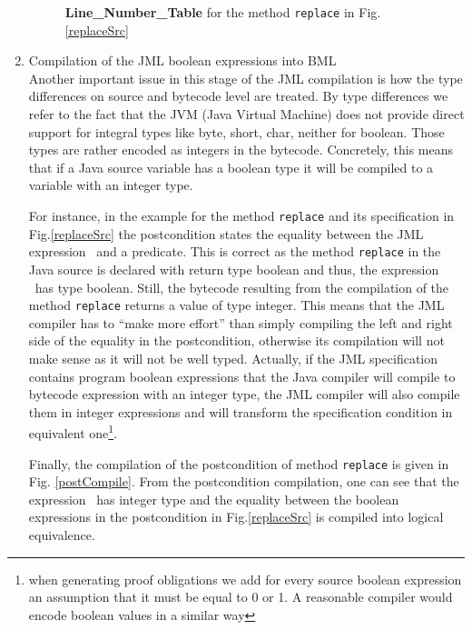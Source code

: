 \begin{enumerate}
\begin{figure}[t]
\caption{\textbf{Line\_Number\_Table}  {\sc for the method } \texttt{replace} {\sc in Fig.  \ref{replaceSrc}  } }
\label{bml:compiler:loopEntry}
\end{figure} 

      
      
\item Compilation of the JML boolean expressions into BML \\
      
     

Another important issue in this stage of the JML compilation is how
the type differences on source and bytecode level are treated. By type
differences we refer to the fact that the JVM (Java Virtual Machine)
does not provide direct support for integral types like byte, short,
char, neither for boolean. Those types are rather encoded as integers
in the bytecode. Concretely, this means that if a Java source variable
has a boolean type it will be compiled to a variable with an integer
type.


 For instance, in the example for the method
\texttt{replace} and its specification in Fig.\ref{replaceSrc} the postcondition states the equality between the JML expression  
\result \ and a predicate. This is correct as the method \texttt{replace} in the Java source is declared with return type boolean  and thus,
 the expression \result \ has type boolean. Still, the bytecode
 resulting from the compilation of the method \texttt{replace} returns
 a value of type integer. This means that the JML compiler has to
 ``make more effort'' than simply compiling the left and right side of
 the equality in the postcondition, otherwise its compilation will not
 make sense as it will not be well typed. Actually, if the JML
 specification contains program boolean expressions that the Java
 compiler will compile to bytecode expression with an integer type,
 the JML compiler will also compile them in integer expressions and
 will transform the specification condition in equivalent
 one\footnote{when generating proof obligations we add for every
 source boolean expression an assumption that it must be equal to 0 or
 1. A reasonable compiler would encode boolean values in a similar
 way}.

Finally, the compilation of the postcondition of method
\texttt{replace} is given in Fig. \ref{postCompile}. From the
postcondition compilation, one can see that the expression \result \
has integer type and the equality between the boolean expressions in
the postcondition in Fig.\ref{replaceSrc} is compiled into logical
equivalence.


\end{enumerate}
